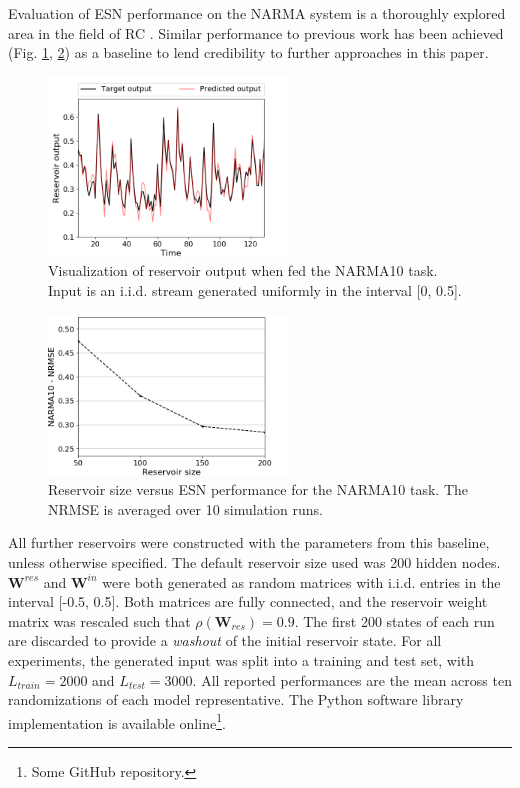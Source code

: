 Evaluation of ESN performance on the NARMA system is a thoroughly explored area
in the field of RC \cite{rodan_minimum_2011, verstraeten_experimental_2007,
jaeger_adaptive_nodate}. Similar performance to previous work has been achieved
(Fig. \ref{visualization}, \ref{performance}) as a baseline to lend credibility
to further approaches in this paper.

\begin{figure}[H]
  \centering
  \includegraphics[width=2.5in]{img/narma_visualization.png}
  \caption{
    Visualization of reservoir output when fed the NARMA10 task. Input is an
i.i.d. stream generated uniformly in the interval [0, 0.5].
  }
  \label{visualization}
\end{figure}

\begin{figure}[H]
  \centering
  \includegraphics[width=2.5in]{img/general_performance.png}
  \caption{
    Reservoir size versus ESN performance for the NARMA10 task. The NRMSE is
averaged over 10 simulation runs.
  }
  \label{performance}
\end{figure}

All further reservoirs were constructed with the parameters from this baseline,
unless otherwise specified. The default reservoir size used was 200 hidden
nodes. $\mathbf{W}^{res}$ and $\mathbf{W}^{in}$ were both generated as random
matrices with i.i.d. entries in the interval [-0.5, 0.5]. Both matrices are
fully connected, and the reservoir weight matrix was rescaled such that
$\rho(\mathbf{W}_{res}) = 0.9$. The first 200 states of each run are discarded
to provide a \textit{washout} of the initial reservoir state. For all
experiments, the generated input was split into a training and test set, with
$L_{train} = 2000$ and $L_{test} = 3000$. All reported performances are the mean
across ten randomizations of each model representative. The Python software
library implementation is available online\footnote{Some GitHub repository.}.

